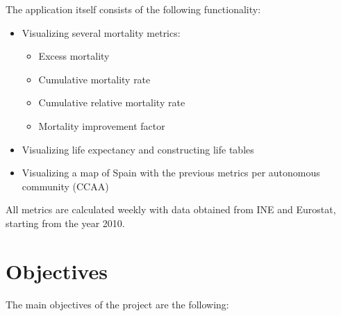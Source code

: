 \documentclass[
  a4paper]{article}
\providecommand{\tightlist}{%
  \setlength{\itemsep}{0pt}\setlength{\parskip}{0pt}}
\begin{document}
The application itself consists of the following functionality:

\begin{itemize}
\item
  Visualizing several mortality metrics:

  \begin{itemize}
  \tightlist
  \item
    Excess mortality
  \item
    Cumulative mortality rate
  \item
    Cumulative relative mortality rate
  \item
    Mortality improvement factor
  \end{itemize}
\item
  Visualizing life expectancy and constructing life tables
\item
  Visualizing a map of Spain with the previous metrics per autonomous
  community (CCAA)
\end{itemize}

All metrics are calculated weekly with data obtained from INE and
Eurostat, starting from the year 2010.

\newpage

\hypertarget{objectives}{%
\section{Objectives}\label{objectives}}

The main objectives of the project are the following:
\end{document}
